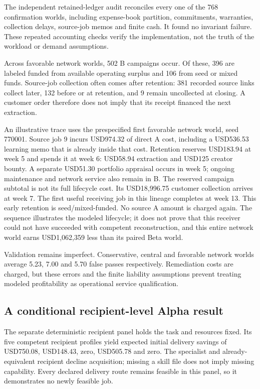 The independent retained-ledger audit reconciles every one of the 768 confirmation worlds, including expense-book partition, commitments, warranties, collection delays, source-job memos and finite cash. It found no invariant failure. These repeated accounting checks verify the implementation, not the truth of the workload or demand assumptions.

Across favorable network worlds, 502 B campaigns occur. Of these, 396 are labeled funded from available operating surplus and 106 from seed or mixed funds. Source-job collection often comes after retention: 381 recorded source links collect later, 132 before or at retention, and 9 remain uncollected at closing. A customer order therefore does not imply that its receipt financed the next extraction.

An illustrative trace uses the prespecified first favorable network world, seed 770001. Source job 9 incurs USD974.32 of direct A cost, including a USD536.53 learning memo that is already inside that cost. Retention reserves USD183.94 at week 5 and spends it at week 6: USD58.94 extraction and USD125 creator bounty. A separate USD51.30 portfolio appraisal occurs in week 5; ongoing maintenance and network service also remain in B. The reserved campaign subtotal is not its full lifecycle cost. Its USD18,996.75 customer collection arrives at week 7. The first useful receiving job in this lineage completes at week 13. This early retention is seed/mixed-funded. No source A amount is charged again. The sequence illustrates the modeled lifecycle; it does not prove that this receiver could not have succeeded with competent reconstruction, and this entire network world earns USD1,062,359 less than its paired Beta world.

Validation remains imperfect. Conservative, central and favorable network worlds average 5.23, 7.00 and 5.70 false passes respectively. Remediation costs are charged, but these errors and the finite liability assumptions prevent treating modeled profitability as operational service qualification.

\subsection{A conditional recipient-level Alpha result}

The separate deterministic recipient panel holds the task and resources fixed. Its five competent recipient profiles yield expected initial delivery savings of USD750.08, USD148.43, zero, USD505.78 and zero. The specialist and already-equivalent recipient decline acquisition; missing a skill file does not imply missing capability. Every declared delivery route remains feasible in this panel, so it demonstrates no newly feasible job.

